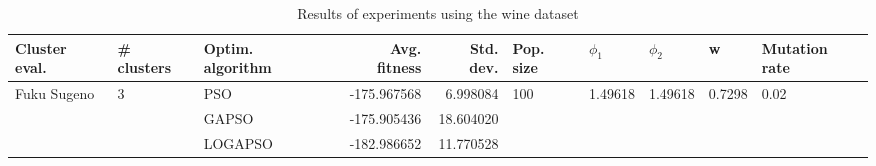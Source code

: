 \begin{table}
\centering
\caption{Results of experiments using the wine dataset}
\begin{tabular}{lllrrlllll}
\toprule
               Cluster eval. &        \# clusters & Optim. algorithm &  Avg. fitness &  Std. dev. &            Pop. size &               $\phi_{1}$ &               $\phi_{2}$ &                       w &         Mutation rate \\
\midrule
\multirow{3}{*}{Fuku Sugeno} & \multirow{3}{*}{3} &              PSO &   -175.967568 &   6.998084 & \multirow{3}{*}{100} & \multirow{3}{*}{1.49618} & \multirow{3}{*}{1.49618} & \multirow{3}{*}{0.7298} & \multirow{3}{*}{0.02} \\
                             &                    &            GAPSO &   -175.905436 &  18.604020 &                      &                          &                          &                         &                       \\
                             &                    &          LOGAPSO &   -182.986652 &  11.770528 &                      &                          &                          &                         &                       \\
\bottomrule
\end{tabular}
\end{table}
